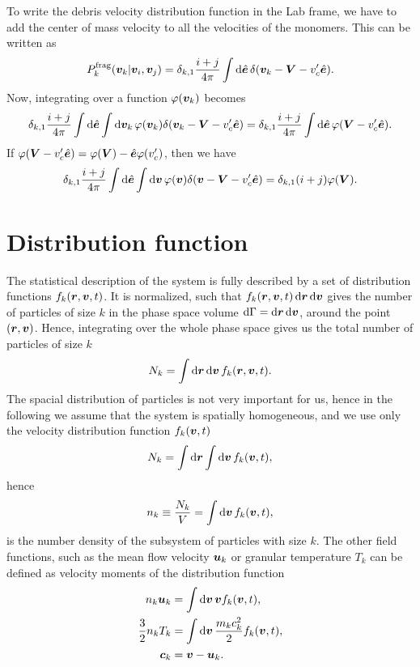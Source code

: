 \documentclass[aps,prl,preprint,groupedaddress,10pt]{revtex4-2}
\begin{document}
To write the debris velocity distribution function in the Lab frame, we have to
add the center of mass velocity to all the velocities of the monomers. This can be
written as
\begin{equation}
    \utx{P_k}{frag}\pqty{\bv_k\vert\bv_i,\bv_j}=
    \delta_{k,1}\frac{i+j}{4\pi}\int\dd{\be}\delta\pqty{\bv_k-\bV-v'_c\be}.
\end{equation}
Now, integrating over a function $\varphi\pqty{\bv_k}$ becomes
\begin{equation}
    \delta_{k,1}\frac{i+j}{4\pi}\int\dd{\be}\int\dd{\bv_k}\varphi\pqty{\bv_k}
    \delta\pqty{\bv_k-\bV-v'_c\be}=
    \delta_{k,1}\frac{i+j}{4\pi}\int\dd{\be}\varphi\pqty{\bV-v'_c\be}.
\end{equation}
If $\varphi\pqty{\bV-v'_c\be}=\varphi\pqty{\bV}-\be\varphi\pqty{v'_c}$, then
we have
\begin{equation}
    \delta_{k,1}\frac{i+j}{4\pi}\int\dd{\be}\int\dd{\bv}\varphi\pqty{\bv}
    \delta\pqty{\bv-\bV-v'_c\be}=\delta_{k,1}\pqty{i+j}\varphi\pqty{\bV}.
\end{equation}


\section{Distribution function}
The statistical description of the system is fully described by a set of distribution
functions $f_k\pqty{\br,\bv,t}$. It is normalized, such that
$f_k\pqty{\br,\bv,t}\dd{\br}\dd{\bv}$ gives the number of particles of size $k$
in the phase space volume $\dd{\Gamma}=\dd{\vb*{r}}\dd{\vb*{v}}$, around the point
$\pqty{\br,\bv}$. Hence, integrating over the whole phase space gives us the total
number of particles of size $k$
\begin{equation}
    N_k=\int\dd{\br}\dd{\bv}f_k\pqty{\br,\bv,t}.
\end{equation}
The spacial distribution of particles is not very important for us, hence in the following
we assume that the system is spatially homogeneous, and we use only the velocity
distribution function $f_k\pqty{\bv,t}$
\begin{equation}
    N_k=\int\dd{\br}\int\dd{\bv}f_k\pqty{\bv,t},
\end{equation}
hence
\begin{equation}
    n_k\equiv\frac{N_k}{V}=\int\dd{\bv}f_k\pqty{\bv,t},
\end{equation}
is the number density of the subsystem of particles with size $k$. The other field
functions, such as the mean flow velocity $\vb*{u}_k$ or granular temperature $T_k$
can be defined as velocity moments of the distribution function
\begin{equation}
    \begin{split}
        n_k\bu_k &= \int\dd{\bv}\bv f_k\pqty{\bv,t},\\
        \frac{3}{2}n_kT_k &=\int\dd{\bv}\frac{m_kc_k^2}{2}f_k\pqty{\bv,t},\\
        \bc_k &= \bv-\bu_k.
    \end{split}
\end{equation}
\end{document}
